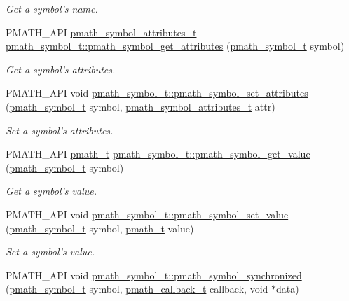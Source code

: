 \begin{CompactItemize}
\begin{CompactList}\small\item\em Get a symbol's name. \item\end{CompactList}\item 
PMATH\_\-API \hyperlink{group__symbols_g5d508ec0d32d617b6c642de54907ee17}{pmath\_\-symbol\_\-attributes\_\-t} \hyperlink{group__symbols_gd553b66226a31e4c105b4f3c93682284}{pmath\_\-symbol\_\-t::pmath\_\-symbol\_\-get\_\-attributes} (\hyperlink{classpmath__symbol__t}{pmath\_\-symbol\_\-t} symbol)
\begin{CompactList}\small\item\em Get a symbol's attributes. \item\end{CompactList}\item 
PMATH\_\-API void \hyperlink{group__symbols_g37c740a2074440f4364763a4dbfab931}{pmath\_\-symbol\_\-t::pmath\_\-symbol\_\-set\_\-attributes} (\hyperlink{classpmath__symbol__t}{pmath\_\-symbol\_\-t} symbol, \hyperlink{group__symbols_g5d508ec0d32d617b6c642de54907ee17}{pmath\_\-symbol\_\-attributes\_\-t} attr)
\begin{CompactList}\small\item\em Set a symbol's attributes. \item\end{CompactList}\item 
PMATH\_\-API \hyperlink{classpmath__t}{pmath\_\-t} \hyperlink{group__symbols_gbf330376870422d219ae9f0557e515c2}{pmath\_\-symbol\_\-t::pmath\_\-symbol\_\-get\_\-value} (\hyperlink{classpmath__symbol__t}{pmath\_\-symbol\_\-t} symbol)
\begin{CompactList}\small\item\em Get a symbol's value. \item\end{CompactList}\item 
PMATH\_\-API void \hyperlink{group__symbols_g8344005c16b86be82d2efdedb0795a0c}{pmath\_\-symbol\_\-t::pmath\_\-symbol\_\-set\_\-value} (\hyperlink{classpmath__symbol__t}{pmath\_\-symbol\_\-t} symbol, \hyperlink{classpmath__t}{pmath\_\-t} value)
\begin{CompactList}\small\item\em Set a symbol's value. \item\end{CompactList}\item 
PMATH\_\-API void \hyperlink{group__symbols_g95b141d9cb33fba80d6a807f304ee3b7}{pmath\_\-symbol\_\-t::pmath\_\-symbol\_\-synchronized} (\hyperlink{classpmath__symbol__t}{pmath\_\-symbol\_\-t} symbol, \hyperlink{group__general__types_ge1a454657f18f3cc54508adeccccbcbc}{pmath\_\-callback\_\-t} callback, void $\ast$data)

\end{CompactItemize}
